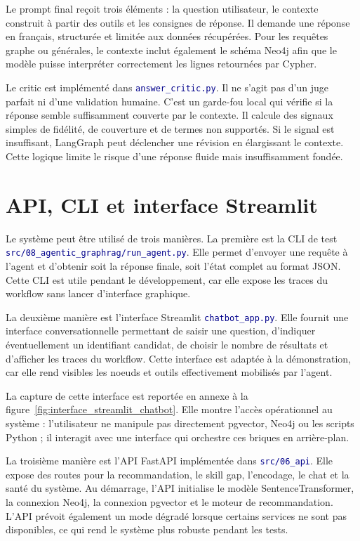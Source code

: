 \documentclass[12pt,twoside]{report}
\newcommand{\filevar}[1]{\texttt{\textcolor{darkblue}{#1}}}
\begin{document}
Le prompt final reçoit trois éléments : la question utilisateur, le contexte construit à partir des outils et les consignes de réponse. Il demande une réponse en français, structurée et limitée aux données récupérées. Pour les requêtes graphe ou générales, le contexte inclut également le schéma Neo4j afin que le modèle puisse interpréter correctement les lignes retournées par Cypher.

Le critic est implémenté dans \filevar{answer\_critic.py}. Il ne s'agit pas d'un juge parfait ni d'une validation humaine. C'est un garde-fou local qui vérifie si la réponse semble suffisamment couverte par le contexte. Il calcule des signaux simples de fidélité, de couverture et de termes non supportés. Si le signal est insuffisant, LangGraph peut déclencher une révision en élargissant le contexte. Cette logique limite le risque d'une réponse fluide mais insuffisamment fondée.

\section{API, CLI et interface Streamlit}

Le système peut être utilisé de trois manières. La première est la CLI de test \filevar{src/08\_agentic\_graphrag/run\_agent.py}. Elle permet d'envoyer une requête à l'agent et d'obtenir soit la réponse finale, soit l'état complet au format JSON. Cette CLI est utile pendant le développement, car elle expose les traces du workflow sans lancer d'interface graphique.

La deuxième manière est l'interface Streamlit \filevar{chatbot\_app.py}. Elle fournit une interface conversationnelle permettant de saisir une question, d'indiquer éventuellement un identifiant candidat, de choisir le nombre de résultats et d'afficher les traces du workflow. Cette interface est adaptée à la démonstration, car elle rend visibles les noeuds et outils effectivement mobilisés par l'agent.

La capture de cette interface est reportée en annexe à la figure~\ref{fig:interface_streamlit_chatbot}. Elle montre l'accès opérationnel au système : l'utilisateur ne manipule pas directement pgvector, Neo4j ou les scripts Python ; il interagit avec une interface qui orchestre ces briques en arrière-plan.

La troisième manière est l'API FastAPI implémentée dans \filevar{src/06\_api}. Elle expose des routes pour la recommandation, le skill gap, l'encodage, le chat et la santé du système. Au démarrage, l'API initialise le modèle SentenceTransformer, la connexion Neo4j, la connexion pgvector et le moteur de recommandation. L'API prévoit également un mode dégradé lorsque certains services ne sont pas disponibles, ce qui rend le système plus robuste pendant les tests.
\end{document}
